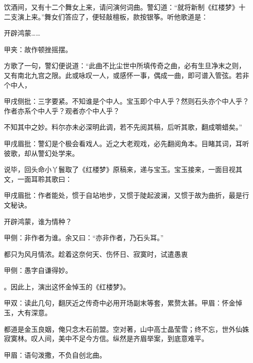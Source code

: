 \begin{parag}
    饮酒间，又有十二个舞女上来，请问演何词曲。警幻道：“就将新制《红楼梦》十二支演上来。”舞女们答应了，便轻敲檀板，款按银筝。听他歌道是：
\end{parag}
\begin{qute}

    开辟鸿蒙……\begin{note}甲夹：故作顿挫摇摆。\end{note}
\end{qute}
\begin{parag}
    方歌了一句，警幻便说道：“此曲不比尘世中所填传奇之曲，必有生旦净末之则，又有南北九宫之限。此或咏叹一人，或感怀一事，偶成一曲，即可谱入管弦。若非个中人，\begin{note}甲戌侧批：三字要紧。不知谁是个中人。宝玉即个中人乎？然则石头亦个中人乎？作者亦系个中人乎？观者亦个中人乎？\end{note}不知其中之妙。料尔亦未必深明此调，若不先阅其稿，后听其歌，翻成嚼蜡矣。”\begin{note}甲戌眉批：警幻是个极会看戏人。近之大老观戏，必先翻阅角本。目睹其词，耳听彼歌，却从警幻处学来。\end{note}说毕，回头命小丫鬟取了《红楼梦》原稿来，递与宝玉。宝玉接来，一面目视其文，一面耳聆其歌曰：\begin{note}甲戌眉批：作者能处，惯于自站地步，又惯于陡起波澜，又惯于故为曲折，最是行文秘诀。\end{note}
\end{parag}
\begin{qute}
    开辟鸿蒙，谁为情种？\begin{note}甲侧：非作者为谁。余又曰：“亦非作者，乃石头耳。”\end{note}都只为风月情浓。趁着这奈何天、伤怀日、寂寞时，试遣愚衷\begin{note}甲侧：愚字自谦得妙。\end{note}。因此上，演出这怀金悼玉的《红楼梦》。\begin{note}甲双：读此几句，翻厌近之传奇中必用开场副末等套，累赘太甚。甲眉：怀金悼玉，大有深意。\end{note}
\end{qute}
\begin{qute}
    都道是金玉良姻，俺只念木石前盟。空对著，山中高士晶莹雪；终不忘，世外仙姝寂寞林。叹人间，美中不足今方信。纵然是齐眉举案，到底意难平。\begin{note}甲眉：语句泼撒，不负自创北曲。\end{note}
\end{qute}
